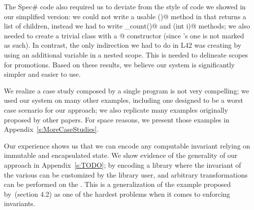 




\noindent The Spec\# code also required us to deviate from the style of code we showed in our simplified version: we could not write a usable \Q@children()@ method in \Q@Widget@ that returns a list of children, instead we had to write \Q@children_count()@ and \Q@children(int i)@ methods; we also needed to create a trivial class with a \Q@[Pure]@ constructor (since \Q@Object@'s one is not marked as such). In contrast, the only indirection we had to do in L42 was creating \Q@Box@es by using 
an additional variable in a nested scope.
This is needed to delineate scopes for promotions.
Based on these results, we believe our system is significantly simpler and easier to use.

We realize a case study composed by a single program is not very compelling; we used our system on many other examples, including one designed to be a worst case scenario for our approach; we also replicate many examples originally proposed by other papers.
For space reasons, we present those examples in  Appendix~\ref{s:MoreCaseStudies}.


Our experience shows us that we can encode any computable invariant relying on immutable and encapsulated state.
We show evidence of the generality of our approach 
in Appendix~\ref{s:TODO};
by encoding a \Q@Graph@ library where the invariant of the various \Q@Node@s can be customized by the library user, and arbitrary transformations can be performed on the \Q@Graph@s.
This is a generalization of the example proposed by~\cite{Summers:2009:NFO:1562154.1562160}(section 4.2)
as one of the hardest problems when it comes to enforcing invariants.

